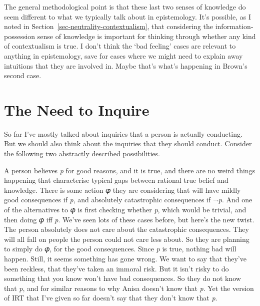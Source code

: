 \documentclass[
  12pt,
  letterpaper,
]{scrbook}
\begin{document}
The general methodological point is that these last two senses of
knowledge do seem different to what we typically talk about in
epistemology. It's possible, as I noted in
Section~\ref{sec-neutrality-contextualism}, that considering the
information-possession sense of knowledge is important for thinking
through whether any kind of contextualism is true. I don't think the
`bad feeling' cases are relevant to anything in epistemology, save for
cases where we might need to explain away intuitions that they are
involved in. Maybe that's what's happening in Brown's second case.

\section{The Need to Inquire}\label{sec-need}

So far I've mostly talked about inquiries that a person is actually
conducting. But we should also think about the inquiries that they
should conduct. Consider the following two abstractly described
possibilities.

A person believes \emph{p} for good reasons, and it is true, and there
are no weird things happening that characterise typical gaps between
rational true belief and knowledge. There is some action 𝜑 they are
considering that will have mildly good consequences if \emph{p}, and
absolutely catastrophic consequences if ¬\emph{p}. And one of the
alternatives to 𝜑 is first checking whether \emph{p}, which would be
trivial, and then doing 𝜑 iff \emph{p}. We've seen lots of these cases
before, but here's the new twist. The person absolutely does not care
about the catastrophic consequences. They will all fall on people the
person could not care less about. So they are planning to simply do 𝜑,
for the good consequences. Since \emph{p} is true, nothing bad will
happen. Still, it seems something has gone wrong. We want to say that
they've been reckless, that they've taken an immoral risk. But it isn't
risky to do something that you know won't have bad consequences. So they
do not know that \emph{p}, and for similar reasons to why Anisa doesn't
know that \emph{p}. Yet the version of IRT that I've given so far
doesn't say that they don't know that \emph{p}.
\end{document}
